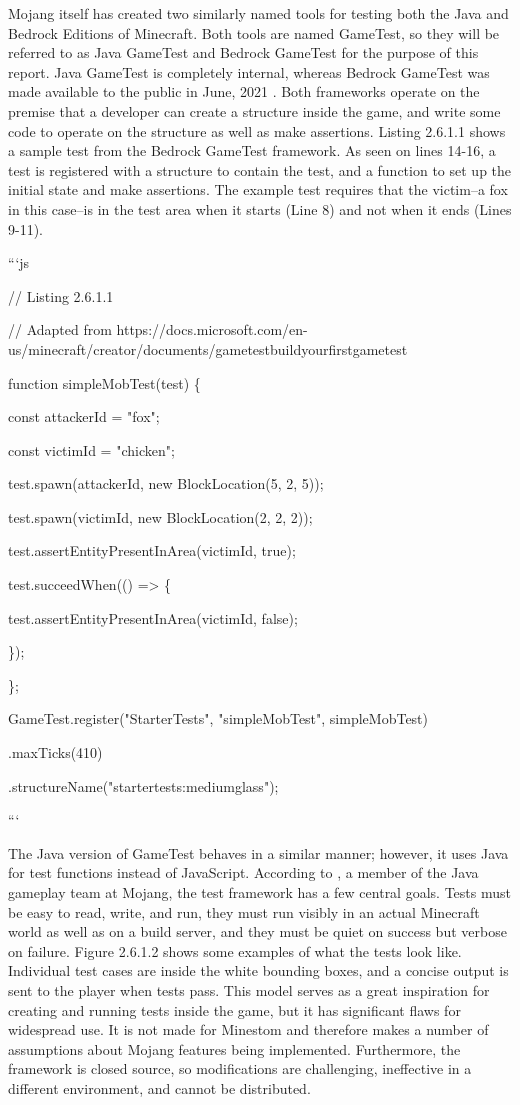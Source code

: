 \documentclass{article}
\begin{document}
\begin{onehalfspacing}
Mojang itself has created two similarly named tools for testing both the
Java and Bedrock Editions of Minecraft. Both tools are named GameTest,
so they will be referred to as Java GameTest and Bedrock GameTest for
the purpose of this report. Java GameTest is completely internal,
whereas Bedrock GameTest was made available to the public in June, 2021
\parencite{ammerlaan2021}. Both frameworks operate on the premise that a
developer can create a structure inside the game, and write some code to
operate on the structure as well as make assertions. Listing 2.6.1.1
shows a sample test from the Bedrock GameTest framework. As seen on
lines 14-16, a test is registered with a structure to contain the test,
and a function to set up the initial state and make assertions. The
example test requires that the victim--a fox in this case--is in the
test area when it starts (Line 8) and not when it ends (Lines 9-11).

```js

// Listing 2.6.1.1

// Adapted from
https://docs.microsoft.com/en-us/minecraft/creator/documents/gametestbuildyourfirstgametest

function simpleMobTest(test) \{

const attackerId = "fox";

const victimId = "chicken";

test.spawn(attackerId, new BlockLocation(5, 2, 5));

test.spawn(victimId, new BlockLocation(2, 2, 2));

test.assertEntityPresentInArea(victimId, true);

test.succeedWhen(() =\textgreater{} \{

test.assertEntityPresentInArea(victimId, false);

\});

\};

GameTest.register("StarterTests", "simpleMobTest", simpleMobTest)

.maxTicks(410)

.structureName("startertests:mediumglass");

```

The Java version of GameTest behaves in a similar manner; however, it
uses Java for test functions instead of JavaScript. According to \textcite{knilberg2020}, a member of the Java gameplay team at Mojang, the test
framework has a few central goals. Tests must be easy to read, write,
and run, they must run visibly in an actual Minecraft world as well as
on a build server, and they must be quiet on success but verbose on
failure. Figure 2.6.1.2 shows some examples of what the tests look like.
Individual test cases are inside the white bounding boxes, and a concise
output is sent to the player when tests pass. This model serves as a
great inspiration for creating and running tests inside the game, but it
has significant flaws for widespread use. It is not made for Minestom
and therefore makes a number of assumptions about Mojang features being
implemented. Furthermore, the framework is closed source, so
modifications are challenging, ineffective in a different environment,
and cannot be distributed.


\end{onehalfspacing}
\end{document}
